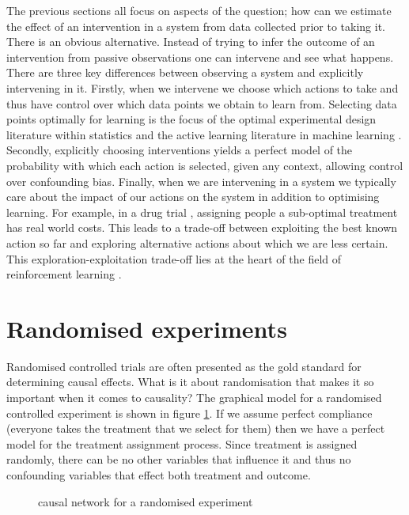 \documentclass[11pt,a4paper,oneside]{book}
\theoremstyle{plain}
\theoremstyle{definition}
\begin{document}
The previous sections all focus on aspects of the question; how can we estimate the effect of an intervention in a system from data collected prior to taking it. There is an obvious alternative. Instead of trying to infer the outcome of an intervention from passive observations one can intervene and see what happens. There are three key differences between observing a system and explicitly intervening in it. Firstly, when we intervene we choose which actions to take and thus have control over which data points we obtain to learn from. Selecting data points optimally for learning is the focus of the optimal experimental design literature within statistics \citep{pukelsheim2006optimal} and the active learning literature in machine learning \citep{settles2010active}. Secondly, explicitly choosing interventions yields a perfect model of the probability with which each action is selected, given any context, allowing control over confounding bias. Finally, when we are intervening in a system we typically care about the impact of our actions on the system in addition to optimising learning. For example, in a drug trial , assigning people a sub-optimal treatment has real world costs. This leads to a trade-off between exploiting the best known action so far and exploring alternative actions about which we are less certain. This exploration-exploitation trade-off lies at the heart of the field of reinforcement learning \citep{sutton1998reinforcement}. 

\section{Randomised experiments}
Randomised controlled trials are often presented as the gold standard for determining causal effects. What is it about randomisation that makes it so important when it comes to causality? The graphical model for a randomised controlled experiment is shown in figure \ref{fig:random_experiment_network}. If we assume perfect compliance (everyone takes the treatment that we select for them) then we have a perfect model for the treatment assignment process. Since treatment is assigned randomly, there can be no other variables that influence it and thus no confounding variables that effect both treatment and outcome. 

\begin{figure}
\centering
{}
\caption{causal network for a randomised experiment}
\label{fig:random_experiment_network}
\end{figure} 
\end{document}
